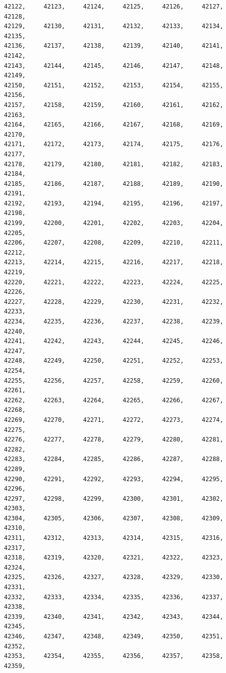 \documentclass[a4paper,11pt]{report}
\begin{document}
\begin{verbatim}
42122,     42123,     42124,     42125,     42126,     42127,     42128,     
42129,     42130,     42131,     42132,     42133,     42134,     42135,     
42136,     42137,     42138,     42139,     42140,     42141,     42142,     
42143,     42144,     42145,     42146,     42147,     42148,     42149,     
42150,     42151,     42152,     42153,     42154,     42155,     42156,     
42157,     42158,     42159,     42160,     42161,     42162,     42163,     
42164,     42165,     42166,     42167,     42168,     42169,     42170,     
42171,     42172,     42173,     42174,     42175,     42176,     42177,     
42178,     42179,     42180,     42181,     42182,     42183,     42184,     
42185,     42186,     42187,     42188,     42189,     42190,     42191,     
42192,     42193,     42194,     42195,     42196,     42197,     42198,     
42199,     42200,     42201,     42202,     42203,     42204,     42205,     
42206,     42207,     42208,     42209,     42210,     42211,     42212,     
42213,     42214,     42215,     42216,     42217,     42218,     42219,     
42220,     42221,     42222,     42223,     42224,     42225,     42226,     
42227,     42228,     42229,     42230,     42231,     42232,     42233,     
42234,     42235,     42236,     42237,     42238,     42239,     42240,     
42241,     42242,     42243,     42244,     42245,     42246,     42247,     
42248,     42249,     42250,     42251,     42252,     42253,     42254,     
42255,     42256,     42257,     42258,     42259,     42260,     42261,     
42262,     42263,     42264,     42265,     42266,     42267,     42268,     
42269,     42270,     42271,     42272,     42273,     42274,     42275,     
42276,     42277,     42278,     42279,     42280,     42281,     42282,     
42283,     42284,     42285,     42286,     42287,     42288,     42289,     
42290,     42291,     42292,     42293,     42294,     42295,     42296,     
42297,     42298,     42299,     42300,     42301,     42302,     42303,     
42304,     42305,     42306,     42307,     42308,     42309,     42310,     
42311,     42312,     42313,     42314,     42315,     42316,     42317,     
42318,     42319,     42320,     42321,     42322,     42323,     42324,     
42325,     42326,     42327,     42328,     42329,     42330,     42331,     
42332,     42333,     42334,     42335,     42336,     42337,     42338,     
42339,     42340,     42341,     42342,     42343,     42344,     42345,     
42346,     42347,     42348,     42349,     42350,     42351,     42352,     
42353,     42354,     42355,     42356,     42357,     42358,     42359,     

\end{verbatim}
\end{document}
